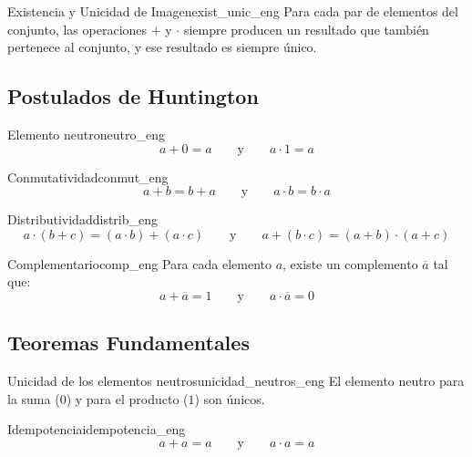 \setcounter{tcb@cnt@preaxioma}{4}
\begin{preaxioma}{Existencia y Unicidad de Imagen}{exist_unic_eng}
Para cada par de elementos del conjunto, las operaciones $+$ y $\cdot$ siempre producen un resultado que también pertenece al conjunto, y ese resultado es siempre único.
\end{preaxioma}

\subsection*{Postulados de Huntington}

\setcounter{tcb@cnt@postulado}{0}
\begin{postulado}{Elemento neutro}{neutro_eng}
\[ a + 0 = a \qquad \text{y} \qquad a \cdot 1 = a \]
\end{postulado}

\setcounter{tcb@cnt@postulado}{2}
\begin{postulado}{Conmutatividad}{conmut_eng}
\[ a + b = b + a \qquad \text{y} \qquad a \cdot b = b \cdot a \]
\end{postulado}

\setcounter{tcb@cnt@postulado}{4}
\begin{postulado}{Distributividad}{distrib_eng}
\[ a \cdot (b + c) = (a \cdot b) + (a \cdot c) \qquad \text{y} \qquad a + (b \cdot c) = (a + b) \cdot (a + c) \]
\end{postulado}

\setcounter{tcb@cnt@postulado}{6}
\begin{postulado}{Complementario}{comp_eng}
Para cada elemento $a$, existe un complemento $\overline{a}$ tal que:
\[ a + \overline{a} = 1 \qquad \text{y} \qquad a \cdot \overline{a} = 0 \]
\end{postulado}

\subsection*{Teoremas Fundamentales}

\setcounter{tcb@cnt@teorema}{0}
\begin{teorema}{Unicidad de los elementos neutros}{unicidad_neutros_eng}
El elemento neutro para la suma ($0$) y para el producto ($1$) son únicos.
\end{teorema}

\setcounter{tcb@cnt@teorema}{1}
\begin{teorema}{Idempotencia}{idempotencia_eng}
\[ a + a = a \qquad \text{y} \qquad a \cdot a = a \]
\end{teorema}

